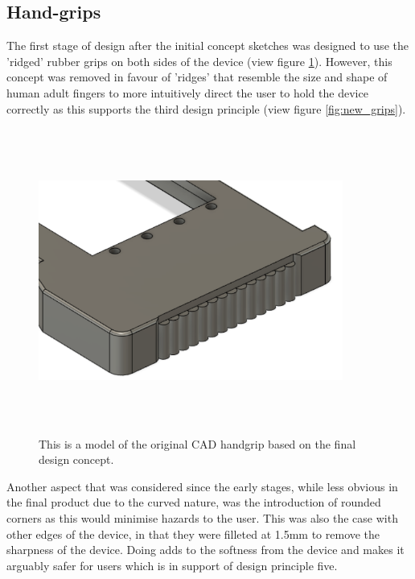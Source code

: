 \subsection{Hand-grips} \label{Handgrip}

The first stage of design after the initial concept sketches was designed to use the 'ridged' rubber grips on both sides of the device (view figure \ref{fig:old_grips}).
However, this concept was removed in favour of 'ridges' that resemble the size and shape of human adult fingers to more intuitively direct the user to hold the device correctly as this supports the third design principle (view figure \ref{fig:new_grips}).

\begin{figure} [h]
    \centering
    \includegraphics[width=10cm,height=10cm,keepaspectratio]{Figures/handgrip_original.png}
    \caption{This is a model of the original CAD handgrip based on the final design concept.}
    \label{fig:old_grips}
\end{figure}

Another aspect that was considered since the early stages, while less obvious in the final product due to the curved nature, was the introduction of rounded corners as this would minimise hazards to the user.
This was also the case with other edges of the device, in that they were filleted at 1.5mm to remove the sharpness of the device.
Doing adds to the softness from the device and makes it arguably safer for users which is in support of design principle five.

